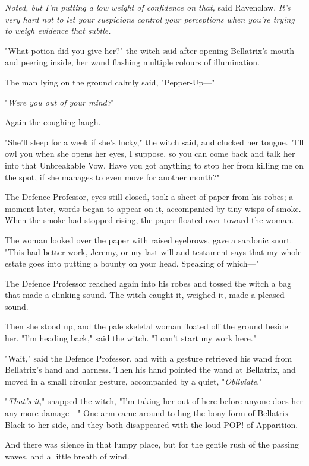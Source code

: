\emph{Noted, but I’m putting a low weight of confidence on that,} said
Ravenclaw. \emph{It’s very hard not to let your suspicions control your
perceptions when you’re trying to weigh evidence that subtle.}

"What potion did you give her?" the witch said after opening Bellatrix’s mouth
and peering inside, her wand flashing multiple colours of illumination.

The man lying on the ground calmly said, "Pepper-Up—"

"\emph{Were you out of your mind?}"

Again the coughing laugh.

"She’ll sleep for a week if she’s lucky," the witch said, and clucked her
tongue. "I’ll owl you when she opens her eyes, I suppose, so you can come back
and talk her into that Unbreakable Vow. Have you got anything to stop her from
killing me on the spot, if she manages to even move for another month?"

The Defence Professor, eyes still closed, took a sheet of paper from his robes;
a moment later, words began to appear on it, accompanied by tiny wisps of
smoke. When the smoke had stopped rising, the paper floated over toward the
woman.

The woman looked over the paper with raised eyebrows, gave a sardonic snort.
"This had better work, Jeremy, or my last will and testament says that my whole
estate goes into putting a bounty on your head. Speaking of which—"

The Defence Professor reached again into his robes and tossed the witch a bag
that made a clinking sound. The witch caught it, weighed it, made a pleased
sound.

Then she stood up, and the pale skeletal woman floated off the ground beside
her. "I’m heading back," said the witch. "I can’t start my work here."

"Wait," said the Defence Professor, and with a gesture retrieved his wand from
Bellatrix’s hand and harness. Then his hand pointed the wand at Bellatrix, and
moved in a small circular gesture, accompanied by a quiet, "\emph{Obliviate}."

"\emph{That’s it}," snapped the witch, "I’m taking her out of here before
anyone does her any more damage—" One arm came around to hug the bony form of
Bellatrix Black to her side, and they both disappeared with the loud POP! of
Apparition.

And there was silence in that lumpy place, but for the gentle rush of the
passing waves, and a little breath of wind.


